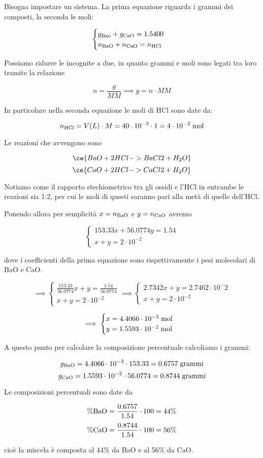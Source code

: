 \begin{soluzione}
    Bisogna impostare un sistema. La prima equazione riguarda i grammi dei composti, la seconda le moli:

$$\begin{cases}
    g_{\rm Bao} + g_{\rm CaO}=1.5400\\
    n_{\rm BaO} + n_{\rm CaO}=n_{\rm HCl}
\end{cases}$$

Possiamo ridurre le incognite a due, in quanto grammi e moli sono legati tra loro tramite la relazione

$$n=\frac{g}{MM}
\implies
g=n \cdot MM$$

In particolare nella seconda equazione le moli di HCl sono date da:

$$n_{\rm HCl}=V(L) \cdot M=40 \cdot 10^{-3} \cdot 1
=4 \cdot 10^{-2} \; \rm mol$$

Le reazioni che avvengono sono

$$\ce{BaO + 2 HCl -> BaCl2 + H_2O}$$
$$\ce{CaO + 2 HCl -> CaCl2 + H_2O}$$

Notiamo come il rapporto stechiometrico tra gli ossidi e l'HCl in entrambe le reazioni sia 1:2, per cui le moli di questi saranno pari alla metà di quelle dell'HCl.

Ponendo allora per semplicità $x=n_{\rm BaO}$ e $y=n_{\rm CaO}$ avremo

$$\begin{cases}
    153.33x + 56.0774y=1.54\\
    x+y=2 \cdot 10^{-2}
\end{cases}$$

dove i coefficienti della prima equazione sono rispettivamente i pesi molecolari di BaO e CaO.

$$\implies
\begin{cases}
    \displaystyle \frac{153.33}{56.0774}x + y=\displaystyle \frac{1.54}{56.0774}\\[0.2cm]
    x+y=2\cdot 10^{-2}
\end{cases}
\implies
\begin{cases}
    2.7342 x + y=2.7462 \cdot 10^-2\\
    x+y=2 \cdot 10^{-2}
\end{cases}$$

$$\implies
\begin{cases}
    x=4.4066 \cdot 10^{-3} \; \rm mol\\
    y=1.5593 \cdot 10^{-2} \; \rm mol
\end{cases}$$

A questo punto per calcolare la composizione percentuale calcoliamo i grammi:

$$g_{\rm BaO}=4.4066 \cdot 10^{-3} \cdot 153.33
=0.6757 \; \text{grammi}$$
$$g_{\rm CaO}=1.5593 \cdot 10^{-2} \cdot 56.0774
=0.8744 \; \rm grammi$$

Le composizioni percentuali sono date da

$$\% \rm BaO=\frac{0.6757}{1.54} \cdot 100=44\%$$
$$\% \rm CaO=\frac{0.8744}{1.54} \cdot 100=56\%$$

cioè la miscela è composta al 44\% da BaO e al 56\% da CaO.

\end{soluzione}

